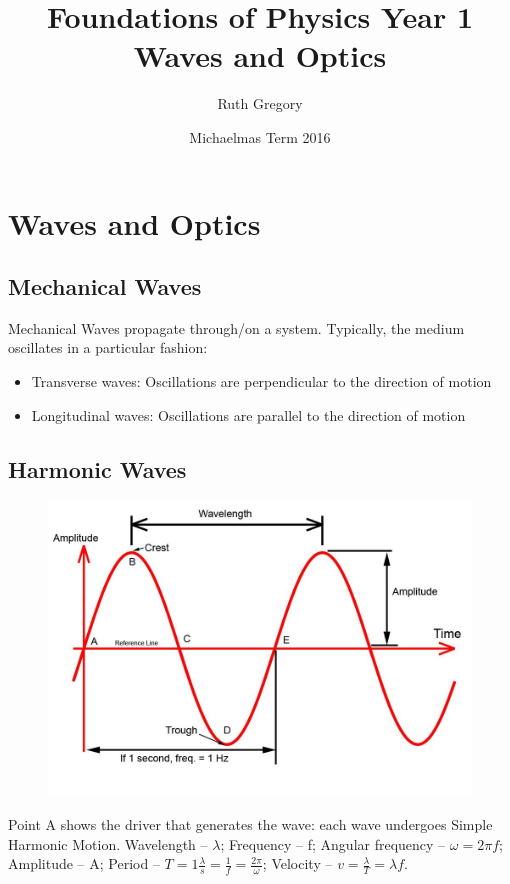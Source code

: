 \documentclass[a4paper, 11pt, normalem]{report}
\title{Foundations of Physics Year 1 \\ Waves and Optics \vspace{-20pt}}
\author{Ruth Gregory}
\date{\vspace{-15pt}Michaelmas Term 2016}
\begin{document}
\maketitle
\thispagestyle{fancy}
\tableofcontents

\chapter{Waves and Optics}
\section{Mechanical Waves}
Mechanical Waves propagate through/on a system.
Typically, the medium oscillates in a particular fashion:
\begin{itemize}
    \item Transverse waves: Oscillations are perpendicular to the direction of motion
    \item Longitudinal waves: Oscillations are parallel to the direction of motion
\end{itemize}

\section{Harmonic Waves}
\begin{figure}[H]
    \centering
    \includegraphics[scale=0.3]{Sine.jpg} 
\end{figure}
Point A shows the driver that generates the wave: each wave undergoes Simple Harmonic Motion.
Wavelength -- $\lambda$; Frequency -- f; Angular frequency -- $\omega = 2{\pi}f$; Amplitude -- A; Period -- $T = 1 \frac{\lambda}{s} = \frac{1}{f} = \frac{2\pi}{\omega}$; Velocity -- $v = \frac{\lambda}{T} = {\lambda}f$.
\end{document}
